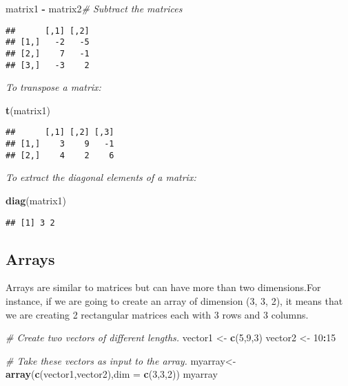 \documentclass[]{book}
\newenvironment{Shaded}{\begin{snugshade}}{\end{snugshade}}
\newcommand{\KeywordTok}[1]{\textcolor[rgb]{0.13,0.29,0.53}{\textbf{#1}}}
\newcommand{\DataTypeTok}[1]{\textcolor[rgb]{0.13,0.29,0.53}{#1}}
\newcommand{\DecValTok}[1]{\textcolor[rgb]{0.00,0.00,0.81}{#1}}
\newcommand{\StringTok}[1]{\textcolor[rgb]{0.31,0.60,0.02}{#1}}
\newcommand{\CommentTok}[1]{\textcolor[rgb]{0.56,0.35,0.01}{\textit{#1}}}
\newcommand{\OperatorTok}[1]{\textcolor[rgb]{0.81,0.36,0.00}{\textbf{#1}}}
\newcommand{\NormalTok}[1]{#1}
\theoremstyle{definition}
\theoremstyle{definition}
\theoremstyle{definition}
\theoremstyle{remark}
\begin{document}
\begin{Shaded}
\begin{Highlighting}[]
\NormalTok{matrix1 }\OperatorTok{-}\StringTok{ }\NormalTok{matrix2}\CommentTok{# Subtract the matrices}
\end{Highlighting}
\end{Shaded}

\begin{verbatim}
##      [,1] [,2]
## [1,]   -2   -5
## [2,]    7   -1
## [3,]   -3    2
\end{verbatim}

\emph{To transpose a matrix:}

\begin{Shaded}
\begin{Highlighting}[]
\KeywordTok{t}\NormalTok{(matrix1)}
\end{Highlighting}
\end{Shaded}

\begin{verbatim}
##      [,1] [,2] [,3]
## [1,]    3    9   -1
## [2,]    4    2    6
\end{verbatim}

\emph{To extract the diagonal elements of a matrix:}

\begin{Shaded}
\begin{Highlighting}[]
\KeywordTok{diag}\NormalTok{(matrix1)}
\end{Highlighting}
\end{Shaded}

\begin{verbatim}
## [1] 3 2
\end{verbatim}

\subsection{Arrays}\label{arrays}

Arrays are similar to matrices but can have more than two dimensions.For
instance, if we are going to create an array of dimension (3, 3, 2), it
means that we are creating 2 rectangular matrices each with 3 rows and 3
columns.

\begin{Shaded}
\begin{Highlighting}[]
\CommentTok{# Create two vectors of different lengths.}
\NormalTok{vector1 <-}\StringTok{ }\KeywordTok{c}\NormalTok{(}\DecValTok{5}\NormalTok{,}\DecValTok{9}\NormalTok{,}\DecValTok{3}\NormalTok{)}
\NormalTok{vector2 <-}\StringTok{ }\DecValTok{10}\OperatorTok{:}\DecValTok{15}

\CommentTok{# Take these vectors as input to the array.}
\NormalTok{myarray<-}\StringTok{ }\KeywordTok{array}\NormalTok{(}\KeywordTok{c}\NormalTok{(vector1,vector2),}\DataTypeTok{dim =} \KeywordTok{c}\NormalTok{(}\DecValTok{3}\NormalTok{,}\DecValTok{3}\NormalTok{,}\DecValTok{2}\NormalTok{))}
\NormalTok{myarray}
\end{Highlighting}
\end{Shaded}
\end{document}
